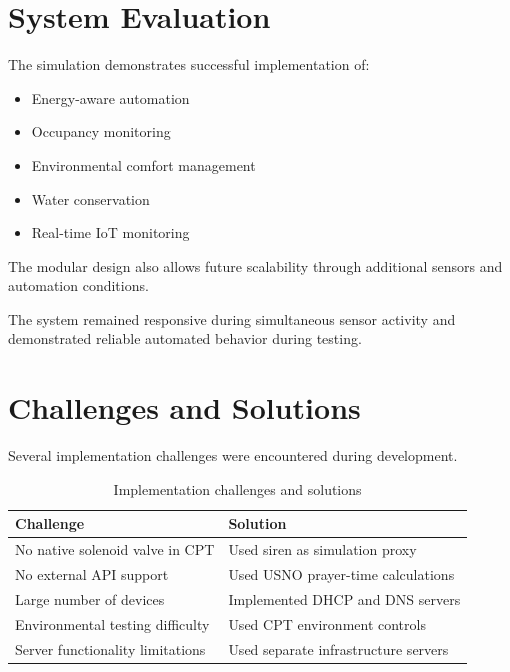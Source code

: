 \documentclass[12pt, a4paper]{article}
\begin{document}
\section{System Evaluation}

The simulation demonstrates successful implementation of:
\begin{itemize}
    \item Energy-aware automation
    \item Occupancy monitoring
    \item Environmental comfort management
    \item Water conservation
    \item Real-time IoT monitoring
\end{itemize}

The modular design also allows future scalability through additional sensors and automation conditions.

The system remained responsive during simultaneous sensor activity and demonstrated reliable automated behavior during testing.

\section{Challenges and Solutions}

Several implementation challenges were encountered during development.

\begin{table}[H]
\centering
\begin{tabular}{L{6cm}L{8cm}}
\toprule
\textbf{Challenge} & \textbf{Solution} \\
\midrule
No native solenoid valve in CPT & Used siren as simulation proxy \\
No external API support & Used USNO prayer-time calculations \\
Large number of devices & Implemented DHCP and DNS servers \\
Environmental testing difficulty & Used CPT environment controls \\
Server functionality limitations & Used separate infrastructure servers \\
\bottomrule
\end{tabular}
\caption{Implementation challenges and solutions}
\end{table}

\end{document}
